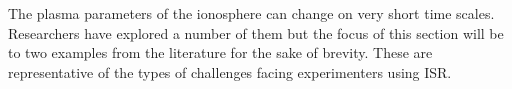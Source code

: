 %
%
%
%

The plasma parameters of the ionosphere can change on very short time scales. Researchers have explored a number of them but the focus of this section will be to two examples from the literature for the sake of brevity. These are representative of the types of challenges facing experimenters using ISR.

